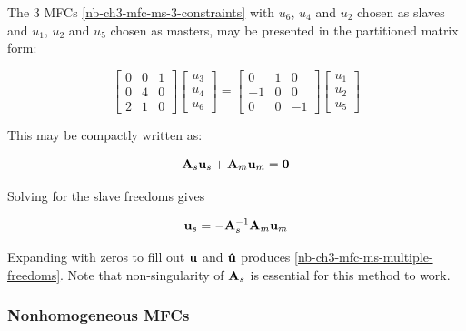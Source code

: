 \begin{bbox}
    The 3 MFCs \eqref{nb-ch3-mfc-ms-3-constraints} with $ u_6 $, $ u_4 $ and $ u_2 $ chosen
    as slaves and $ u_1 $, $ u_2 $ and $ u_5 $ chosen as masters, may be presented
    in the partitioned matrix form:

    \begin{equation}
        \begin{bmatrix}
            0 & 0 & 1 \\
            0 & 4 & 0 \\
            2 & 1 & 0
        \end{bmatrix}
        \begin{bmatrix}
            u_3 \\
            u_4 \\
            u_6
        \end{bmatrix}
        = \begin{bmatrix}
            0 & 1 & 0 \\
            -1 & 0 & 0 \\
            0 & 0 & -1
        \end{bmatrix}
        \begin{bmatrix}
            u_1 \\
            u_2 \\
            u_5
        \end{bmatrix}
    \end{equation}

     This may be compactly written as:

     \begin{equation}
         \mathbf{A}_s \mathbf{u}_s + \mathbf{A}_m \mathbf{u}_m = \mathbf{0}
     \end{equation}

     Solving for the slave freedoms gives

     \begin{equation}
         \mathbf{u}_s = -\mathbf{A}_s^{-1} \mathbf{A}_m \mathbf{u}_m
     \end{equation}

     Expanding with zeros to fill out $ \mathbf{u} $ and $ \mathbf{\hat{u}} $
     produces \eqref{nb-ch3-mfc-ms-multiple-freedoms}. Note that non-singularity of
     $ \mathbf{A}_s $ is essential for this method to work.
\end{bbox}


\subsubsection{Nonhomogeneous MFCs}

